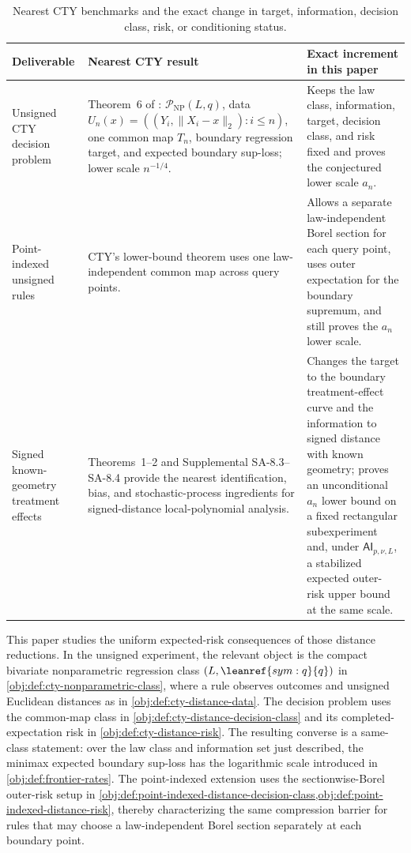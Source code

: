 \documentclass[11pt]{article}
\begin{document}
\begin{table}[t]
\centering
\small
\renewcommand{\arraystretch}{1.15}
\begin{tabular}{p{}p{}p{}}
\hline
Deliverable & Nearest CTY result & Exact increment in this paper \\
\hline
Unsigned CTY decision problem & Theorem~6 of \citet{CattaneoTitiunikYu2026Distance}: \(\mathcal P_{\mathrm{NP}}(L,q)\), data \(U_n(x)=((Y_i,\lVert X_i-x\rVert_2):i\le n)\), one common map \(T_n\), boundary regression target, and expected boundary sup-loss; lower scale \(n^{-1/4}\). & Keeps the law class, information, target, decision class, and risk fixed and proves the conjectured lower scale \(a_n\). \\
Point-indexed unsigned rules & CTY's lower-bound theorem uses one law-independent common map across query points. & Allows a separate law-independent Borel section for each query point, uses outer expectation for the boundary supremum, and still proves the \(a_n\) lower scale. \\
Signed known-geometry treatment effects & Theorems~1--2 and Supplemental SA-8.3--SA-8.4 provide the nearest identification, bias, and stochastic-process ingredients for signed-distance local-polynomial analysis. & Changes the target to the boundary treatment-effect curve and the information to signed distance with known geometry; proves an unconditional \(a_n\) lower bound on a fixed rectangular subexperiment and, under \(\mathsf{AI}_{p,\nu,L}\), a stabilized expected outer-risk upper bound at the same scale. \\
\hline
\end{tabular}
\caption{Nearest CTY benchmarks and the exact change in target, information, decision class, risk, or conditioning status.}
\label{tab:cty-comparison}
\end{table}

This paper studies the uniform expected-risk consequences of those distance reductions. In the unsigned experiment, the relevant object is the compact bivariate nonparametric regression class \((L,\leanref{sym:q}{\ensuremath{q}})\) in \cref{obj:def:cty-nonparametric-class}, where a rule observes outcomes and unsigned Euclidean distances as in \cref{obj:def:cty-distance-data}. The decision problem uses the common-map class  in \cref{obj:def:cty-distance-decision-class} and its completed-expectation risk  in \cref{obj:def:cty-distance-risk}. The resulting converse is a same-class statement: over the law class and information set just described, the minimax expected boundary sup-loss has the logarithmic scale  introduced in \cref{obj:def:frontier-rates}. The point-indexed extension uses the sectionwise-Borel outer-risk setup in \cref{obj:def:point-indexed-distance-decision-class,obj:def:point-indexed-distance-risk}, thereby characterizing the same compression barrier for rules that may choose a law-independent Borel section separately at each boundary point.
\end{document}
